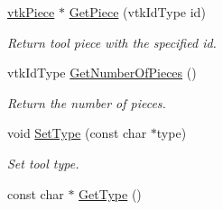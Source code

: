 \begin{DoxyCompactItemize}
\item 
\hyperlink{classvtkPiece}{vtkPiece} $\ast$ \hyperlink{classvtkTool_a4316c5cd3281c663da03f6854c350788}{GetPiece} (vtkIdType id)
\begin{DoxyCompactList}\small\item\em Return tool piece with the specified id. \item\end{DoxyCompactList}\item 
vtkIdType \hyperlink{classvtkTool_a22808ab908533188843b2970424d8310}{GetNumberOfPieces} ()
\begin{DoxyCompactList}\small\item\em Return the number of pieces. \item\end{DoxyCompactList}\item 
\hypertarget{classvtkTool_a85c781ea4c52e8512b2628e0262a99ca}{
void \hyperlink{classvtkTool_a85c781ea4c52e8512b2628e0262a99ca}{SetType} (const char $\ast$type)}
\label{classvtkTool_a85c781ea4c52e8512b2628e0262a99ca}

\begin{DoxyCompactList}\small\item\em Set tool type. \item\end{DoxyCompactList}\item 
\hypertarget{classvtkTool_ab09b1fa6f511ca80859b3e59cedd62de}{
const char $\ast$ \hyperlink{classvtkTool_ab09b1fa6f511ca80859b3e59cedd62de}{GetType} ()}
\label{classvtkTool_ab09b1fa6f511ca80859b3e59cedd62de}


\end{DoxyCompactItemize}
